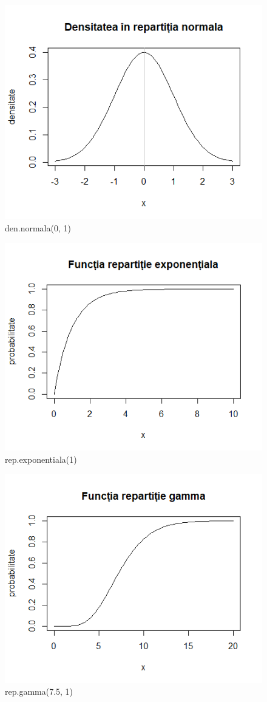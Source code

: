 \documentclass[12pt]{article}
\begin{document}
	\begin{figure}[h!]
		\centering		
		\includegraphics[scale=0.75]{DenNorm}
		\caption{den.normala(0, 1)}
	\end{figure}

	\begin{figure}
		\centering
		\includegraphics[scale=0.75]{RepExp}
		\caption{rep.exponentiala(1)}	
	\end{figure}

	\begin{figure}
		\centering
		\includegraphics[scale=0.75]{RepGamma}
		\caption{rep.gamma(7.5, 1)}	
	\end{figure}
	
\end{document}
